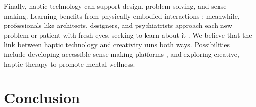 Finally, haptic technology can support design, problem-solving, and sense-making.
Learning benefits from physically embodied interactions \cite{Papert1980}; meanwhile, professionals like architects, designers, and psychiatrists approach each new problem or patient with fresh eyes, seeking to learn about it \cite{Schon1982}.
We believe that the link between haptic technology and creativity runs both ways.
Possibilities include developing accessible sense-making platforms \cite{Swaminathan2016}, and exploring creative, haptic therapy to promote mental wellness.

%
%
\section{Conclusion}




\endinput
